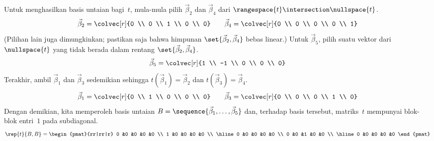 Untuk menghasilkan basis untaian bagi~$t$, mula-mula
pilih \( \vec{\beta}_2 \) dan \( \vec{\beta}_4 \) dari
\( \rangespace{t}\intersection\nullspace{t} \).
\begin{equation*}
  \vec{\beta}_2=\colvec[r]{0 \\ 0 \\ 1 \\ 0 \\ 0}\qquad
  \vec{\beta}_4=\colvec[r]{0 \\ 0 \\ 0 \\ 0 \\ 1}
\end{equation*}
(Pilihan lain juga dimungkinkan; pastikan saja bahwa himpunan
\( \set{\vec{\beta}_2,\vec{\beta}_4} \) bebas linear.)
Untuk \( \vec{\beta}_5 \), pilih suatu vektor dari \( \nullspace{t} \)
yang tidak berada dalam rentang \( \set{ \vec{\beta}_2,\vec{\beta}_4 } \).
\begin{equation*}
  \vec{\beta}_5=\colvec[r]{1 \\ -1 \\ 0 \\ 0 \\ 0}
\end{equation*}
Terakhir, ambil \( \vec{\beta}_1 \) dan \( \vec{\beta}_3 \) sedemikian sehingga
\( t(\vec{\beta}_1)=\vec{\beta}_2 \) dan
\( t(\vec{\beta}_3)=\vec{\beta}_4 \).
\begin{equation*}
  \vec{\beta}_1=\colvec[r]{0 \\ 1 \\ 0 \\ 0 \\ 0}\qquad
  \vec{\beta}_3=\colvec[r]{0 \\ 0 \\ 0 \\ 1 \\ 0}
\end{equation*}
Dengan demikian, kita memperoleh basis untaian
\( B=\sequence{\vec{\beta}_1,\ldots,\vec{\beta}_5} \)
dan, terhadap basis tersebut,
matriks~$t$ mempunyai blok-blok entri~$1$ pada subdiagonal.
\begin{equation*}
  \rep{t}{B,B}=
  \begin{pmat}{rr|rr|r}
    0  &0  &0  &0  &0  \\
    1  &0  &0  &0  &0  \\  \hline
    0  &0  &0  &0  &0  \\
    0  &0  &1  &0  &0  \\  \hline
    0  &0  &0  &0  &0
  \end{pmat}
\end{equation*}

